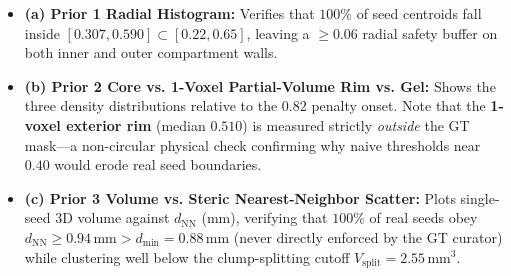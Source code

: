 \documentclass[10pt,a4paper]{article}
\renewcommand{\_}{\origunderscore\allowbreak}
\begin{document}
\begin{itemize}
\begin{itemize}
\item \textbf{(a) Prior 1 Radial Histogram:} Verifies that $100\%$ of seed centroids fall inside $[0.307, 0.590] \subset [0.22, 0.65]$, leaving a $\ge 0.06$ radial safety buffer on both inner and outer compartment walls.
\item \textbf{(b) Prior 2 Core vs. 1-Voxel Partial-Volume Rim vs. Gel:} Shows the three density distributions relative to the $0.82$ penalty onset. Note that the \textbf{1-voxel exterior rim} (median $0.510$) is measured strictly \textit{outside} the GT mask---a non-circular physical check confirming why naive thresholds near $0.40$ would erode real seed boundaries.
\item \textbf{(c) Prior 3 Volume vs. Steric Nearest-Neighbor Scatter:} Plots single-seed 3D volume against $d_{\text{NN}}$ (mm), verifying that $100\%$ of real seeds obey $d_{\text{NN}} \ge 0.94\,\text{mm} > d_{\min} = 0.88\,\text{mm}$ (never directly enforced by the GT curator) while clustering well below the clump-splitting cutoff $V_{\text{split}} = 2.55\,\text{mm}^3$.
\end{itemize}
\end{itemize}
\end{document}
